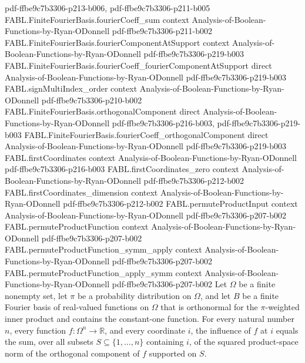 \begin{theorem}
  {pdf-ffbe9c7b3306-p213-b006,
    pdf-ffbe9c7b3306-p211-b005}
\proofstep
  {FABL.FiniteFourierBasis.fourierCoeff_sum}
  {context}
  {Analysis-of-Boolean-Functions-by-Ryan-ODonnell}
  {pdf-ffbe9c7b3306-p211-b002}
\proofstep
  {FABL.FiniteFourierBasis.fourierComponentAtSupport}
  {context}
  {Analysis-of-Boolean-Functions-by-Ryan-ODonnell}
  {pdf-ffbe9c7b3306-p219-b003}
\proofstep
  {FABL.FiniteFourierBasis.fourierCoeff_fourierComponentAtSupport}
  {direct}
  {Analysis-of-Boolean-Functions-by-Ryan-ODonnell}
  {pdf-ffbe9c7b3306-p219-b003}
\proofstep
  {FABL.signMultiIndex_order}
  {context}
  {Analysis-of-Boolean-Functions-by-Ryan-ODonnell}
  {pdf-ffbe9c7b3306-p210-b002}
\proofstep
  {FABL.FiniteFourierBasis.orthogonalComponent}
  {direct}
  {Analysis-of-Boolean-Functions-by-Ryan-ODonnell}
  {pdf-ffbe9c7b3306-p216-b003,
    pdf-ffbe9c7b3306-p219-b003}
\proofstep
  {FABL.FiniteFourierBasis.fourierCoeff_orthogonalComponent}
  {direct}
  {Analysis-of-Boolean-Functions-by-Ryan-ODonnell}
  {pdf-ffbe9c7b3306-p219-b003}
\proofstep
  {FABL.firstCoordinates}
  {context}
  {Analysis-of-Boolean-Functions-by-Ryan-ODonnell}
  {pdf-ffbe9c7b3306-p216-b003}
\proofstep
  {FABL.firstCoordinates_zero}
  {context}
  {Analysis-of-Boolean-Functions-by-Ryan-ODonnell}
  {pdf-ffbe9c7b3306-p212-b002}
\proofstep
  {FABL.firstCoordinates_dimension}
  {context}
  {Analysis-of-Boolean-Functions-by-Ryan-ODonnell}
  {pdf-ffbe9c7b3306-p212-b002}
\proofstep
  {FABL.permuteProductInput}
  {context}
  {Analysis-of-Boolean-Functions-by-Ryan-ODonnell}
  {pdf-ffbe9c7b3306-p207-b002}
\proofstep
  {FABL.permuteProductFunction}
  {context}
  {Analysis-of-Boolean-Functions-by-Ryan-ODonnell}
  {pdf-ffbe9c7b3306-p207-b002}
\proofstep
  {FABL.permuteProductFunction_symm_apply}
  {context}
  {Analysis-of-Boolean-Functions-by-Ryan-ODonnell}
  {pdf-ffbe9c7b3306-p207-b002}
\proofstep
  {FABL.permuteProductFunction_apply_symm}
  {context}
  {Analysis-of-Boolean-Functions-by-Ryan-ODonnell}
  {pdf-ffbe9c7b3306-p207-b002}
Let $\Omega$ be a finite nonempty set, let $\pi$ be a probability distribution on
$\Omega$, and let $B$ be a finite Fourier basis of real-valued functions on $\Omega$
that is orthonormal for the $\pi$-weighted inner product and contains the constant-one
function. For every natural number $n$, every function $f:\Omega^n\to\mathbb R$, and
every coordinate $i$, the influence of $f$ at $i$ equals the sum, over all subsets
$S\subseteq\{1,\ldots,n\}$ containing $i$, of the squared product-space norm of the
orthogonal component of $f$ supported on $S$.
\end{theorem}

